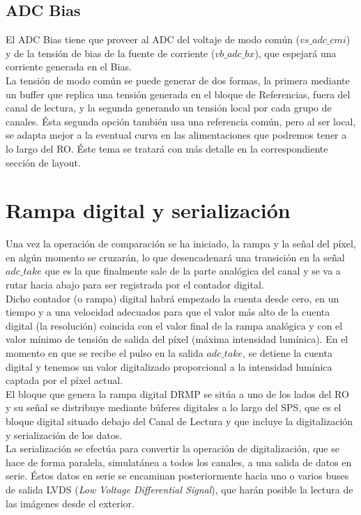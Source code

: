 \subsection{ADC Bias}

El ADC Bias tiene que proveer al ADC del voltaje de modo común ($vs\_adc\_cmi$) y
de la tensión de bias de la fuente de corriente ($vb\_adc\_bx$), que espejará
una corriente generada en el Bias.\\

La tensión de modo común se puede generar de dos formas, la primera mediante un
buffer que replica una tensión generada en el bloque de Referencias, fuera del
canal de lectura, y la segunda generando un tensión local por cada grupo de canales.
Ésta segunda opción también usa una referencia común, pero al ser local, se adapta
mejor a la eventual curva en las alimentaciones que podremos tener a lo largo
del RO. Éste tema se tratará con más detalle en la correspondiente sección de layout.\\

\section{Rampa digital y serialización}

Una vez la operación de comparación se ha iniciado, la rampa y la señal del píxel,
en algún momento se cruzarán, lo que desencadenará una transición en la señal
$adc\_take$ que es la que finalmente sale de la parte analógica del canal y se va
a rutar hacia abajo para ser registrada por el contador digital.\\

Dicho contador (o rampa) digital habrá empezado la cuenta desde cero, en un tiempo y a una
velocidad adecuados para que el valor más alto de la cuenta digital (la resolución)
coincida con el valor final de la rampa analógica y con el valor mínimo de tensión
de salida del píxel (máxima intensidad lumínica). En el momento en que se recibe
el pulso en la salida $adc\_take$, se detiene la cuenta digital y tenemos un valor
digitalizado proporcional a la intensidad lumínica captada por el píxel actual.\\

El bloque que genera la rampa digital DRMP se sitúa a uno de los lados del RO y
su señal se distribuye mediante búferes digitales a lo largo del SPS, que es
el bloque digital situado debajo del Canal de Lectura y que incluye la digitalización
y serialización de los datos.\\

La serialización se efectúa para convertir la operación de digitalización, que se
hace de forma paralela, simulatánea a todos los canales, a una salida de datos en serie.
Éstos datos en serie se encaminan posteriormente hacia uno o varios buses de salida LVDS
(\textit{Low Voltage Differential Signal}), que harán posible la lectura de las imágenes
desde el exterior.\\
